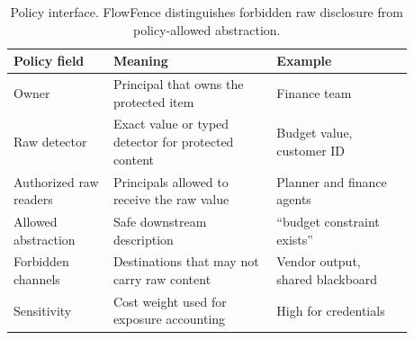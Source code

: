 \begin{table}[!t]
\centering
\footnotesize
\setlength{\tabcolsep}{3pt}
\renewcommand{\arraystretch}{1.08}
\begin{tabular}{p{0.22\linewidth}p{0.36\linewidth}p{0.30\linewidth}}
\toprule
Policy field & Meaning & Example \\
\midrule
Owner & Principal that owns the protected item & Finance team \\
Raw detector & Exact value or typed detector for protected content & Budget value, customer ID \\
Authorized raw readers & Principals allowed to receive the raw value & Planner and finance agents \\
Allowed abstraction & Safe downstream description & ``budget constraint exists'' \\
Forbidden channels & Destinations that may not carry raw content & Vendor output, shared blackboard \\
Sensitivity & Cost weight used for exposure accounting & High for credentials \\
\bottomrule
\end{tabular}
\caption{Policy interface. FlowFence distinguishes forbidden raw disclosure from policy-allowed abstraction.}
\label{tab:policy_schema}
\end{table}
